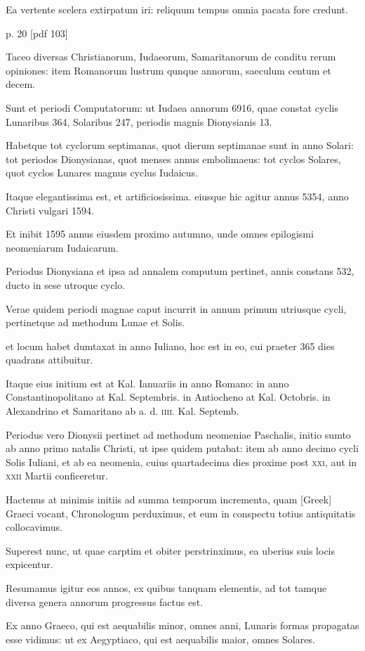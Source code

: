 Ea vertente scelera
extirpatum iri: reliquum tempus omnia pacata fore credunt.


p. 20 [pdf 103]

Taceo
diversas Christianorum, Iudaeorum, Samaritanorum de conditu rerum
opiniones: item Romanorum lustrum qunque annorum, saeculum
centum et decem.

Sunt et periodi Computatorum: ut Iudaea
annorum 6916, quae constat cyclis Lunaribus 364, Solaribus 247, periodis
magnis Dionysianis 13.

Habetque tot cyclorum septimanas,
quot dierum septimanae sunt in anno Solari: tot periodos Dionysianas,
quot menses annus embolimaeus: tot cyclos Solares, quot cyclos
Lunares magnus cyclus Iudaicus.

Itaque elegantissima est, et artificiosissima.
eiusque hic agitur annus 5354, anno Christi vulgari 1594.

Et inibit 1595 annus eiusdem proximo autumno, unde omnes epilogismi
neomeniarum Iudaicarum.

Periodus Dionysiana et ipsa ad
annalem computum pertinet, annis constans 532, ducto in sese utroque
cyclo.

Verae quidem periodi magnae caput incurrit in annum
primum utriusque cycli, pertinetque ad methodum Lunae et Solis.

et
locum habet dumtaxat in anno Iuliano, hoc est in eo, cui praeter 365
dies quadrans attibuitur.

Itaque eius initium est at Kal. Ianuariis in
anno Romano: in anno Constantinopolitano at Kal. Septembris. in
Antiocheno at Kal. Octobris. in Alexandrino et Samaritano ab a. d.
\textsc{iiii}. Kal. Septemb.

Periodus vero Dionysii pertinet ad methodum
neomeniae Paschalis, initio sumto ab anno primo natalis Christi, ut
ipse quidem putabat: item ab anno decimo cycli Solis Iuliani, et ab
ea neomenia, cuius quartadecima dies proxime post
 \textsc{xxi}, aut in \textsc{xxii}
Martii conficeretur.

Hactenus at minimis initiis ad summa temporum
incrementa, quam \textgreek{[Greek]} Graeci vocant, Chronologum
perduximus, et eum in conspectu totius antiquitatis collocavimus.

Superest nunc, ut quae carptim et obiter perstrinximus, ea uberius
suis locis expicentur.

Resumamus igitur eos annos, ex quibus tanquam
elementis, ad tot tamque diversa genera annorum progressus
factus est.

Ex anno Graeco, qui est aequabilis minor, omnes anni, Lunaris
formas propagatas esse vidimus: ut ex Aegyptiaco, qui est aequabilis
maior, omnes Solares.

